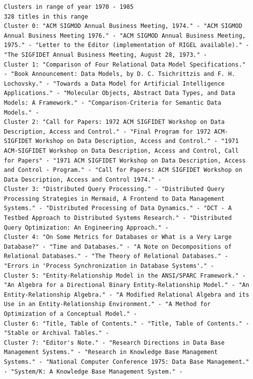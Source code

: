 \documentclass[a4paper,fontsize=11pt]{article}
\begin{document}
\begin{lstlisting}[caption={KMeans output},label={lst:output},breaklines]
Clusters in range of year 1970 - 1985
328 titles in this range
Cluster 0: "ACM SIGMOD Annual Business Meeting, 1974." - "ACM SIGMOD Annual Business Meeting 1976." - "ACM SIGMOD Annual Business Meeting, 1975." - "Letter to the Editor (implementation of RIGEL available)." - "The SIGFIDET Annual Business Meeting, August 28, 1973." - 
Cluster 1: "Comparison of Four Relational Data Model Specifications." - "Book Announcement: Data Models, by D. C. Tsichrittzis and F. H. Lochovsky." - "Towards a Data Model for Artificial Intelligence Applications." - "Molecular Objects, Abstract Data Types, and Data Models: A Framework." - "Comparison-Criteria for Semantic Data Models." - 
Cluster 2: "Call for Papers: 1972 ACM SIGFIDET Workshop on Data Description, Access and Control." - "Final Program for 1972 ACM-SIGFIDET Workshop on Data Description, Access and Control." - "1971 ACM-SIGFIDET Workshop on Data Description, Access and Control, Call for Papers" - "1971 ACM SIGFIDET Workshop on Data Description, Access and Control - Program." - "Call for Papers: ACM SIGFIDET Workshop on Data Description, Access and Control 1974." - 
Cluster 3: "Distributed Query Processing." - "Distributed Query Processing Strategies in Mermaid, A Frontend to Data Management Systems." - "Distributed Processing of Data Dynamics." - "DCT - A Testbed Approach to Distributed Systems Research." - "Distributed Query Optimization: An Engineering Approach." - 
Cluster 4: "On Some Metrics for Databases or What is a Very Large Database?" - "Time and Databases." - "A Note on Decompositions of Relational Databases." - "The Theory of Relational Databases." - "Errors in 'Process Synchronization in Database Systems'." - 
Cluster 5: "Entity-Relationship Model in the ANSI/SPARC Framework." - "An Algebra for a Directional Binary Entity-Relationship Model." - "An Entity-Relationship Algebra." - "A Modified Relational Algebra and its Use in an Entity-Relationship Environment." - "A Method for Optimization of a Conceptual Model." - 
Cluster 6: "Title, Table of Contents." - "Title, Table of Contents." - "Stable or Archival Tables." - 
Cluster 7: "Editor's Note." - "Research Directions in Data Base Management Systems." - "Research in Knowledge Base Management Systems." - "National Computer Conference 1975: Data Base Management." - "System/K: A Knowledge Base Management System." - 



\end{lstlisting}
\end{document}
